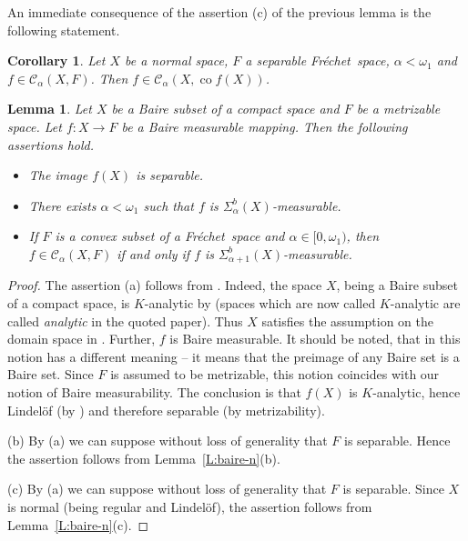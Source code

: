 \documentclass{amsart}
\numberwithin{equation}{section}
\newtheorem{lemma}[thm]{Lemma}
\newtheorem{cor}[thm]{Corollary}
\theoremstyle{definition}
\def\C{\mathcal C}
\def\co{\operatorname{co}}
\newcommand{\fr}{Fr\'echet\ }
\begin{document}
An immediate consequence of the assertion (c) of the previous lemma is the following statement.

\begin{cor}\label{C:baire} Let $X$ be a normal space, $F$ a separable \fr space, $\alpha<\omega_1$ and $f\in\C_\alpha(X,F)$.
Then $f\in\C_\alpha(X,\co f(X))$.
\end{cor}

\begin{lemma}
\label{L:baire}
Let $X$ be a Baire subset of a compact space and $F$ be a metrizable space. Let $f\colon X\to F$ be a Baire measurable mapping. Then the following assertions hold.
\begin{itemize}
\item [(a)] The image $f(X)$ is separable.
\item [(b)] There exists $\alpha<\omega_1$ such that $f$ is $\Sigma_\alpha^b(X)$-measurable.
\item [(c)] If $F$ is a convex subset of a \fr space and $\alpha\in [0,\omega_1)$, then $f\in\C_\alpha(X,F)$ if and only if $f$ is $\Sigma_{\alpha+1}^b(X)$-measurable.
\end{itemize}
\end{lemma}

\begin{proof}
The assertion (a) follows from \cite[Theorem 1]{frolik-bulams}. Indeed, the space $X$, being a Baire subset of a compact space,
is $K$-analytic by \cite[Proposition $\beta$ on p.1113]{frolik-bulams} (spaces which are now called $K$-analytic are called \emph{analytic} in the quoted paper). Thus $X$ satisfies the assumption on the domain space in \cite[Theorem 1]{frolik-bulams}.
Further, $f$ is Baire measurable. It should be noted, that in \cite{frolik-bulams} this notion has a different meaning
-- it means that the preimage of any Baire set is a Baire set. Since $F$ is assumed to be metrizable, this notion coincides with our notion of Baire measurability. The conclusion is that $f(X)$ is $K$-analytic, hence Lindel\"of (by \cite[Proposition $\alpha$ on p.1113]{frolik-bulams}) and therefore separable (by metrizability).

(b) By (a) we can suppose without loss of generality that $F$ is separable. Hence the assertion follows from Lemma~\ref{L:baire-n}(b).

(c) By (a) we can suppose without loss of generality that $F$ is separable. Since $X$ is normal (being regular and Lindel\"of), the assertion follows from Lemma~\ref{L:baire-n}(c).
\end{proof}
\end{document}

